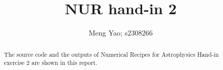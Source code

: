 \documentclass[a4paper,10pt]{article}
\title{NUR hand-in 2}
\author{Meng Yao; s2308266}
\begin{document}
\maketitle

\begin{abstract}
 The source code and the outputs of Numerical Recipes for Astrophysics Hand-in exercise 2 are shown in this report.
\end{abstract}


















\end{document}
